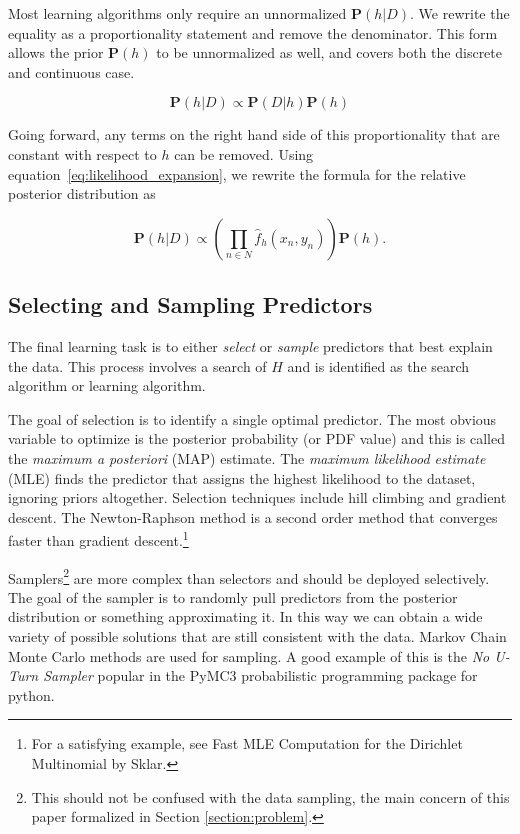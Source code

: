 \documentclass[twoside]{article}
\begin{document}
Most learning algorithms only require an unnormalized \(\mathbf{P}(h|D)\). We rewrite the equality as a proportionality statement and remove the denominator. This form allows the prior \(\mathbf{P}(h)\) to be unnormalized as well, and covers both the discrete and continuous case.

\begin{equation}
\label{eq:bayes}
\mathbf{P}(h|D)\propto\mathbf{P}(D|h)\mathbf{P}(h)
\end{equation}

Going forward, any terms on the right hand side of this proportionality that are constant with respect to \(h\) can be removed. Using equation~\eqref{eq:likelihood_expansion}, we rewrite the formula for the relative posterior distribution as

\begin{equation}
\label{eq:bayes_likelihood_expanded}
\mathbf{P}(h|D)\propto \left( \prod_{n \in N} \hat{f}_h(x_n,y_n) \right) \mathbf{P}(h).
\end{equation}

\subsection{Selecting and Sampling Predictors}

The final learning task is to either \textit{select} or \textit{sample} predictors that best explain the data. This process involves a search of \(H\) and is identified as the search algorithm or learning algorithm.

The goal of selection is to identify a single optimal predictor. The most obvious variable to optimize is the posterior probability (or PDF value) and this is called the \textit{maximum a posteriori} (MAP) estimate. The \textit{maximum likelihood estimate} (MLE) finds the predictor that assigns the highest likelihood to the dataset, ignoring priors altogether. Selection techniques include hill climbing and gradient descent. The Newton-Raphson method is a second order method that converges faster than gradient descent.\footnote{For a satisfying example, see Fast MLE Computation for the Dirichlet Multinomial by Sklar\cite{sklar_dirichlet}.}

Samplers\footnote{This should not be confused with the data sampling, the main concern of this paper formalized in Section \ref{section:problem}.} are more complex than selectors and should be deployed selectively. The goal of the sampler is to randomly pull predictors from the posterior distribution or something approximating it. In this way we can obtain a wide variety of possible solutions that are still consistent with the data. Markov Chain Monte Carlo methods are used for sampling. A good example of this is the \textit{No U-Turn Sampler}\cite{gelman} popular in the PyMC3\cite{pymc3} probabilistic programming package for python.
\end{document}
